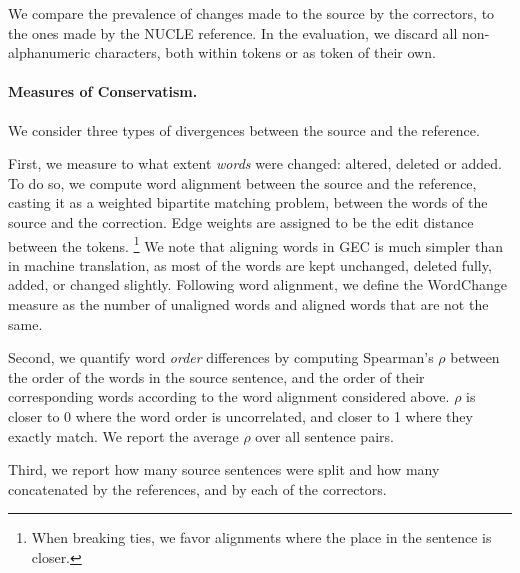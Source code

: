 \documentclass[letter,11pt]{article}
\newcommand{\oa}[1]{\footnote{\color{red}OA: #1}}
\begin{document}
We compare the prevalence of changes made to the source by the correctors,
to the ones made by the NUCLE reference. In the evaluation, we discard all non-alphanumeric
characters, both within tokens or as token of their own.



\paragraph{Measures of Conservatism.}
We consider three types of divergences between the source and the reference.

First, we measure to what extent \emph{words} were changed: altered, deleted or added.
To do so, we compute word alignment between the source and the reference, casting it
as a weighted bipartite matching problem, between the words of the source
and the correction. 
Edge weights are assigned to be the edit distance between the tokens.
\footnote{When breaking ties, we favor alignments where the place in the sentence is closer.}
We note that aligning words in GEC is much simpler than in machine translation,
as most of the words are kept unchanged, deleted fully, added, or changed slightly.
Following word alignment, we define the {\sc WordChange} measure
as the number of unaligned words and aligned words that are not the same.

Second, we quantify word \emph{order} differences by computing
Spearman's $\rho$ between the order of the words in the source sentence,
and the order of their corresponding words according to the word alignment considered above.
$\rho$ is closer to 0 where the word order is uncorrelated, and closer to 1 where they
exactly match. We report the average $\rho$ over all sentence pairs. 

Third, we report how many source sentences were split and how many concatenated by the references,
and by each of the correctors.
\end{document}

